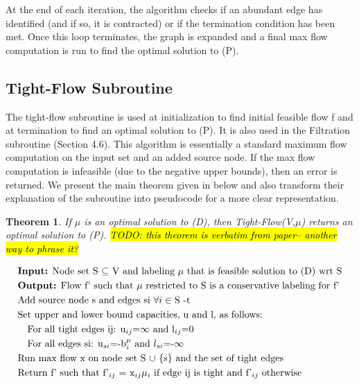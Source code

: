 \documentclass[11pt]{article}
\newtheorem{theorem}{Theorem}[section]
\theoremstyle{definition}
\theoremstyle{definition}
\newcommand{\todo}[1]{\hl{TODO: #1}}
\begin{document}
	At the end of each iteration, the algorithm checks if an abundant edge has identified (and if so, it is contracted) or if the termination condition has been met. Once this loop terminates, the graph is expanded and a final max flow computation is run to find the optimal solution to (P).
	\subsection{Tight-Flow Subroutine}
	The tight-flow subroutine is used at initialization to find initial feasible flow f and at termination to find an optimal solution to (P). It is also used in the Filtration subroutine (Section 4.6). This algorithm is essentially a standard maximum flow computation on the input set and an added source node. If the max flow computation is infeasible (due to the negative upper bounds), then an error is returned. We present the main theorem given in \cite{Vegh2013} below and also transform their explanation of the subroutine into pseudocode for a more clear representation.
	\begin{theorem}
	If $\mu$ is an optimal solution to (D), then Tight-Flow(V,$\mu$) returns an optimal solution to (P). \todo{this theorem is verbatim from paper-- another way to phrase it?}
	\end{theorem}
	
	\begin{align*}
	&\text{\textbf{Input:} Node set S $\subseteq$ V and labeling $\mu$ that is feasible solution to (D) wrt S} \\
	&\text{\textbf{Output:} Flow f' such that $\mu$ restricted to S is a conservative labeling for f'} \\
	&\text{Add source node s and edges si $\forall i \in$ S -t} \\
	&\text{Set upper and lower bound capacities, u and l, as follows: } \\
	&\quad \text{For all tight edges ij: u$_{ij}$=$\infty$ and l$_{ij}$=0} \\
	&\quad \text{For all edges si: u$_{si}$=-b$_i^\mu$ and $l_{si}$=-$\infty$} \\
	&\text{Run max flow x on node set S $\cup$ $\{$s$\}$ and the set of tight edges} \\
	&\text{Return f' such that f'$_{ij}$ = x$_{ij}\mu_i$ if edge ij is tight and f'$_{ij}$ otherwise}
	\end{align*}
	
\end{document}
